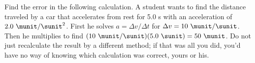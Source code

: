  Find the error in the following calculation. A student
wants to find the distance traveled by a car that accelerates
from rest for 5.0 s with an acceleration of $2.0\ \munit/\sunit^2$.
First he solves $a=\Delta v/\Delta t$ for $\Delta v=10 \ \munit/\sunit$.
Then he multiplies to find $(10\ \munit/\sunit)(5.0\ \sunit)=50\ \munit$. Do not
just recalculate the result by a different method; if that
was all you did, you'd have no way of knowing which
calculation was correct, yours or his.
